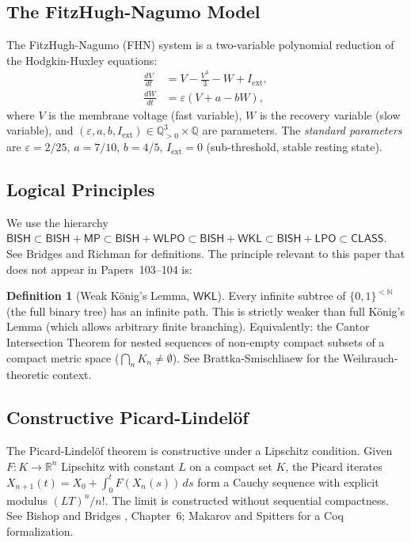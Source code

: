 \documentclass[11pt,a4paper]{article}
\theoremstyle{plain}
\theoremstyle{definition}
\newtheorem{definition}[theorem]{Definition}
\newcommand{\BISH}{\textsf{BISH}}
\newcommand{\WKL}{\textsf{WKL}}
\newcommand{\WLPO}{\textsf{WLPO}}
\newcommand{\LPO}{\textsf{LPO}}
\newcommand{\MP}{\textsf{MP}}
\newcommand{\CLASS}{\textsf{CLASS}}
\newcommand{\Q}{\mathbb{Q}}
\newcommand{\R}{\mathbb{R}}
\newcommand{\N}{\mathbb{N}}
\begin{document}
\subsection{The FitzHugh-Nagumo Model}

The FitzHugh-Nagumo (FHN) system \cite{fitzhugh1961,nagumo1962} is a two-variable polynomial reduction of the Hodgkin-Huxley equations:
\begin{align}
  \frac{dV}{dt} &= V - \frac{V^3}{3} - W + I_{\mathrm{ext}}, \label{eq:fhn1} \\
  \frac{dW}{dt} &= \varepsilon(V + a - bW), \label{eq:fhn2}
\end{align}
where $V$ is the membrane voltage (fast variable), $W$ is the recovery variable (slow variable), and $(\varepsilon, a, b, I_{\mathrm{ext}}) \in \Q_{>0}^3 \times \Q$ are parameters.  The \emph{standard parameters} are $\varepsilon = 2/25$, $a = 7/10$, $b = 4/5$, $I_{\mathrm{ext}} = 0$ (sub-threshold, stable resting state).

\subsection{Logical Principles}

We use the hierarchy $\BISH \subset \BISH + \MP \subset \BISH + \WLPO \subset \BISH + \WKL \subset \BISH + \LPO \subset \CLASS$.  See Bridges and Richman \cite{bridges1987} for definitions.  The principle relevant to this paper that does not appear in Papers~103--104 is:

\begin{definition}[Weak K\"onig's Lemma, $\WKL$]
Every infinite subtree of $\{0,1\}^{<\N}$ (the full binary tree) has an infinite path.  This is strictly weaker than full K\"onig's Lemma (which allows arbitrary finite branching).  Equivalently: the Cantor Intersection Theorem for nested sequences of non-empty compact subsets of a compact metric space ($\bigcap_n K_n \neq \emptyset$).  See Brattka-Smischliaew \cite{brattka2024} for the Weihrauch-theoretic context.
\end{definition}

\subsection{Constructive Picard-Lindel\"of}

The Picard-Lindel\"of theorem is constructive under a Lipschitz condition.  Given $F : K \to \R^n$ Lipschitz with constant $L$ on a compact set $K$, the Picard iterates $X_{n+1}(t) = X_0 + \int_0^t F(X_n(s))\,ds$ form a Cauchy sequence with explicit modulus $(LT)^n/n!$.  The limit is constructed without sequential compactness.  See Bishop and Bridges \cite{bishop1985}, Chapter~6; Makarov and Spitters \cite{makarov2013} for a Coq formalization.
\end{document}
